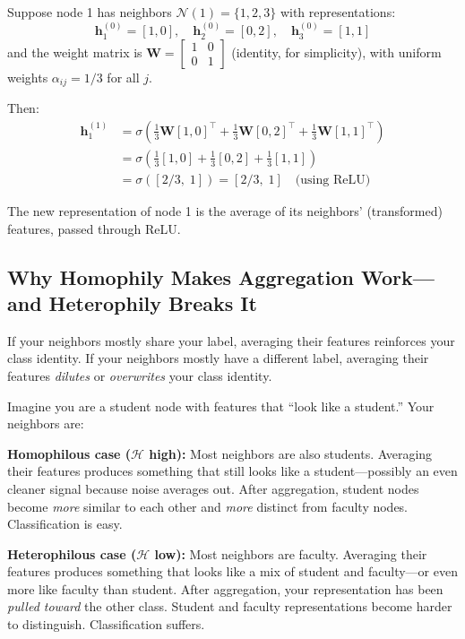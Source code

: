 \documentclass[11pt,a4paper]{article}
\newcommand{\N}{\mathcal{N}}
\newcommand{\bW}{\mathbf{W}}
\newcommand{\bh}{\mathbf{h}}
\theoremstyle{definition}
\theoremstyle{plain}
\begin{document}
\begin{example}
Suppose node 1 has neighbors $\N(1) = \{1, 2, 3\}$ with representations:
\[
  \bh_1^{(0)} = [1, 0],\quad \bh_2^{(0)} = [0, 2],\quad \bh_3^{(0)} = [1, 1]
\]
and the weight matrix is $\bW = \begin{bmatrix} 1 & 0 \\ 0 & 1 \end{bmatrix}$
(identity, for simplicity),
with uniform weights $\alpha_{ij} = 1/3$ for all $j$.

Then:
\begin{align*}
  \bh_1^{(1)} &= \sigma\!\left(\tfrac{1}{3}\bW[1,0]^\top + \tfrac{1}{3}\bW[0,2]^\top
    + \tfrac{1}{3}\bW[1,1]^\top\right) \\
  &= \sigma\!\left(\tfrac{1}{3}[1,0] + \tfrac{1}{3}[0,2] + \tfrac{1}{3}[1,1]\right) \\
  &= \sigma\!\left([2/3,\; 1]\right) = [2/3,\; 1] \quad\text{(using ReLU)}
\end{align*}

The new representation of node 1 is the average of its neighbors' (transformed)
features, passed through ReLU.
\end{example}


\subsection{Why Homophily Makes Aggregation Work---and Heterophily Breaks It}
\label{sec:why_homo_works}

\begin{keyidea}
If your neighbors mostly share your label, averaging their features reinforces
your class identity.
If your neighbors mostly have a different label, averaging their features
\emph{dilutes} or \emph{overwrites} your class identity.
\end{keyidea}

Imagine you are a student node with features that ``look like a student.''
Your neighbors are:

\textbf{Homophilous case ($\mathcal{H}$ high):}
Most neighbors are also students.
Averaging their features produces something that still looks like a student---possibly
an even cleaner signal because noise averages out.
After aggregation, student nodes become \emph{more} similar to each other and
\emph{more} distinct from faculty nodes.
Classification is easy.

\textbf{Heterophilous case ($\mathcal{H}$ low):}
Most neighbors are faculty.
Averaging their features produces something that looks like a mix of student and
faculty---or even more like faculty than student.
After aggregation, your representation has been \emph{pulled toward} the other
class.
Student and faculty representations become harder to distinguish.
Classification suffers.
\end{document}

